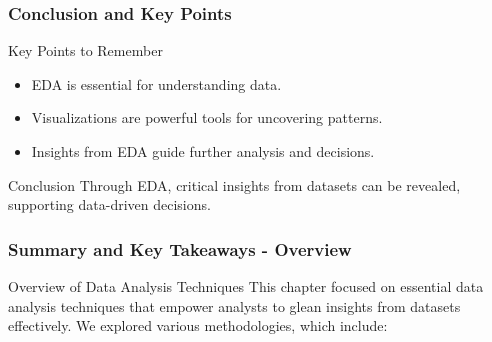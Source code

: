 \documentclass[aspectratio=169]{beamer}
\begin{document}
\begin{frame}[fragile]
    \frametitle{Conclusion and Key Points}
    \begin{block}{Key Points to Remember}
        \begin{itemize}
            \item EDA is essential for understanding data.
            \item Visualizations are powerful tools for uncovering patterns.
            \item Insights from EDA guide further analysis and decisions.
        \end{itemize}
    \end{block}
    \begin{block}{Conclusion}
        Through EDA, critical insights from datasets can be revealed, supporting data-driven decisions.
    \end{block}
\end{frame}

\begin{frame}[fragile]
    \frametitle{Summary and Key Takeaways - Overview}
    \begin{block}{Overview of Data Analysis Techniques}
        This chapter focused on essential data analysis techniques that empower analysts to glean insights from datasets effectively. We explored various methodologies, which include:
    \end{block}
\end{frame}
\end{document}
